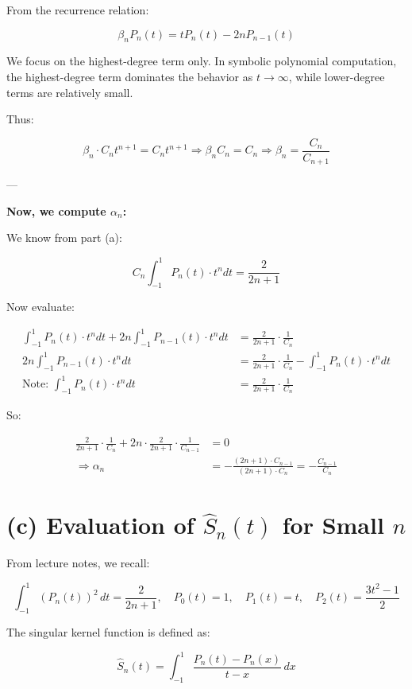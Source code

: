 \documentclass{article}
\begin{document}
From the recurrence relation:

\[
\beta_n P_n(t) = t P_n(t) - 2n P_{n-1}(t)
\]

We focus on the highest-degree term only. In symbolic polynomial computation, the highest-degree term dominates the behavior as \( t \to \infty \), while lower-degree terms are relatively small.

Thus:

\[
\beta_n \cdot C_n t^{n+1} = C_n t^{n+1}
\Rightarrow \beta_n C_n = C_n
\Rightarrow \boxed{\beta_n = \frac{C_n}{C_{n+1}}}
\]

---

\textbf{Now, we compute \( \alpha_n \):}

We know from part (a):

\[
C_n \int_{-1}^{1} P_n(t) \cdot t^n dt = \frac{2}{2n+1}
\]

Now evaluate:

\begin{align*}
\int_{-1}^{1} P_n(t) \cdot t^n dt + 2n \int_{-1}^{1} P_{n-1}(t) \cdot t^n dt &= \frac{2}{2n+1} \cdot \frac{1}{C_n} \\
2n \int_{-1}^{1} P_{n-1}(t) \cdot t^n dt &= \frac{2}{2n+1} \cdot \frac{1}{C_n} - \int_{-1}^{1} P_n(t) \cdot t^n dt \\
\text{Note: } \int_{-1}^{1} P_n(t) \cdot t^n dt &= \frac{2}{2n+1} \cdot \frac{1}{C_n}
\end{align*}

So:

\begin{align*}
\frac{2}{2n+1} \cdot \frac{1}{C_n} + 2n \cdot \frac{2}{2n+1} \cdot \frac{1}{C_{n-1}} &= 0 \\
\Rightarrow \alpha_n &= - \frac{(2n+1) \cdot C_{n-1}}{(2n+1) \cdot C_n}
= \boxed{- \frac{C_{n-1}}{C_n}}
\end{align*}

\section*{(c) Evaluation of $\hat{S}_n(t)$ for Small $n$}

From lecture notes, we recall:

\[
\int_{-1}^{1} (P_n(t))^2 \, dt = \frac{2}{2n+1}, \quad
P_0(t) = 1, \quad
P_1(t) = t, \quad
P_2(t) = \frac{3t^2 - 1}{2}
\]

The singular kernel function is defined as:

\[
\hat{S}_n(t) = \int_{-1}^{1} \frac{P_n(t) - P_n(x)}{t - x} \, dx
\]
\end{document}
